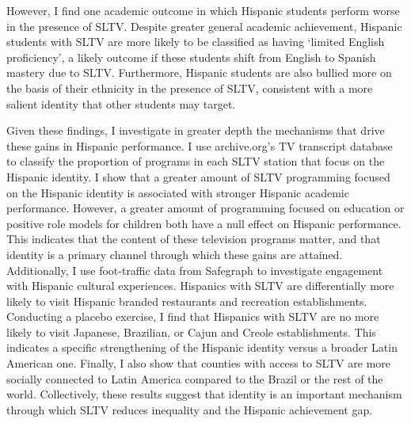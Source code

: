 \documentclass[11pt]{article}
\begin{document}
However, I find one academic outcome in which Hispanic students perform worse in the presence of SLTV. Despite greater general academic achievement, Hispanic students with SLTV are more likely to be classified as having ‘limited English proficiency’, a likely outcome if these students shift from English to Spanish mastery due to SLTV. Furthermore, Hispanic students are also bullied more on the basis of their ethnicity in the presence of SLTV, consistent with a more salient identity that other students may target.

Given these findings, I investigate in greater depth the mechanisms that drive these gains in Hispanic performance. I use archive.org’s TV transcript database to classify the proportion of programs in each SLTV station that focus on the Hispanic identity. I show that a greater amount of SLTV programming focused on the Hispanic identity is associated with stronger Hispanic academic performance. However, a greater amount of programming focused on education or positive role models for children both have a null effect on Hispanic performance. This indicates that the content of these television programs matter, and that identity is a primary channel through which these gains are attained. Additionally, I use foot-traffic data from Safegraph to investigate engagement with Hispanic cultural experiences. Hispanics with SLTV are differentially more likely to visit Hispanic branded restaurants and recreation establishments. Conducting a placebo exercise, I find that Hispanics with SLTV are no more likely to visit Japanese, Brazilian, or Cajun and Creole establishments. This indicates a specific strengthening of the Hispanic identity versus a broader Latin American one. Finally, I also show that counties with access to SLTV are more socially connected to Latin America compared to the Brazil or the rest of the world. Collectively, these results suggest that identity is an important mechanism through which SLTV reduces inequality and the Hispanic achievement gap. 
\end{document}
